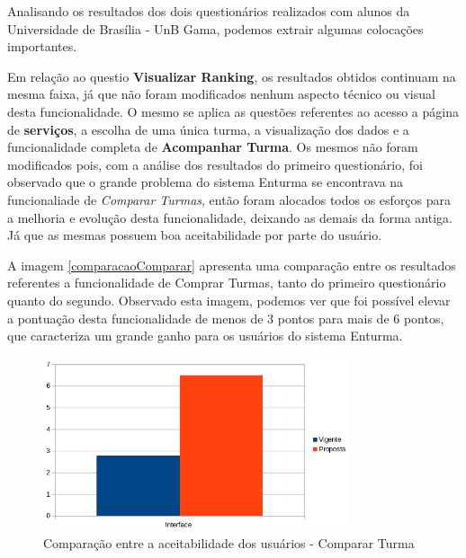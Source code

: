 Analisando os resultados dos dois questionários realizados com alunos da Universidade de Brasília - UnB Gama, podemos extrair algumas colocações importantes.

Em relação ao questio \textbf{Visualizar Ranking}, os resultados obtidos continuam na mesma faixa, já que não foram modificados nenhum aspecto técnico ou visual desta funcionalidade. O mesmo se aplica as questões referentes ao acesso a página de \textbf{serviços}, a escolha de uma única turma, a visualização dos dados e a funcionalidade completa de \textbf{Acompanhar Turma}. Os mesmos não foram modificados pois, com a análise dos resultados do primeiro questionário, foi observado que o grande problema do sistema Enturma se encontrava na funcionaliade de \textit{Comparar Turmas}, então foram alocados todos os esforços para a melhoria e evolução desta funcionalidade, deixando as demais da forma antiga. Já que as mesmas possuem boa aceitabilidade por parte do usuário.

A imagem \ref{comparacaoComparar} apresenta uma comparação entre os resultados referentes a funcionalidade de Comprar Turmas, tanto do primeiro questionário quanto do segundo. Observado esta imagem, podemos ver que foi possível elevar a pontuação desta funcionalidade de menos de 3 pontos para mais de 6 pontos, que caracteriza um grande ganho para os usuários do sistema Enturma.

\begin{figure}[H]
	\centering
	\includegraphics[width=0.8\textwidth]{imagens/comparacaoComparar}
	\caption{Comparação entre a aceitabilidade dos usuários - Comparar Turma}
	\label{img:comparacaoComparar}
\end{figure}


